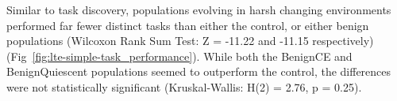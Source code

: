 \documentclass[10pt,letterpaper,final]{article}
\begin{document}
Similar to task discovery, populations evolving in harsh changing environments performed far fewer distinct tasks than either the control, or either benign populations (Wilcoxon Rank Sum Test: Z = -11.22 and -11.15 respectively) (Fig~\ref{fig:lte-simple-task_performance}). While both the BenignCE and BenignQuiescent
populations seemed to outperform the control, 
the differences were not statistically significant (Kruskal-Wallis: H(2) = 2.76, p = 0.25).


\end{document}
